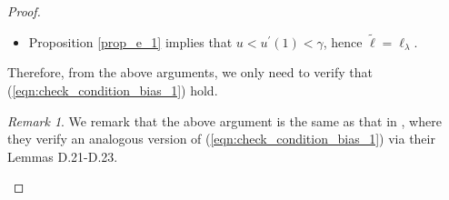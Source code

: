 \documentclass{article}
\theoremstyle{plain}
\theoremstyle{definition}
\theoremstyle{remark}
\newtheorem{remark}[theorem]{Remark}
\newcommand{\bbP}{\mathbb{P}}
\newcommand{\calN}{\mathcal{N}}
\newcommand{\reg}{\varphi_\lambda}
\begin{document}
\begin{appendix}
\begin{proof}
\begin{itemize}
\begin{itemize}
        \item Suppose the following inequalities hold (which we will prove later)
        \begin{equation}\label{eqn:check_condition_bias_1}
      \begin{aligned}
          \frac{ \mathcal{N}_{1}(\lambda) \mathcal{M}_{1, \varphi}^2(\lambda)}{n^2}
    &= 
    o_{d}\left( \mathcal{M}_{2, \varphi}(\lambda) + \frac{\sigma^2}{n} \calN_{2,\varphi}(\lambda)  \right),\\
    \frac{\mathcal{N}_{1}(\lambda)}{n} \ln(n) (\ln\lambda^{-1})^2 \cdot \sum_{i=1}^\infty \frac{\lambda^2 \lambda_i \reg^2(\lambda_i)}{\lambda + \lambda_i} f_i^2  
    &= 
    o_{d}\left( \mathcal{M}_{2, \varphi}(\lambda) + \frac{\sigma^2}{n} \calN_{2,\varphi}(\lambda)  \right).
      \end{aligned}
  \end{equation}
  Then, on one hand, since $u < u^{\prime}(1) < \gamma$, from Lemma 23 in \cite{zhang2024optimal}, there exists $\epsilon>0$, such that
        $$
        n^{\epsilon - 1}\mathcal{N}_{1}(\lambda) = \Theta_d(n^{\epsilon - 1} \lambda^{-1})= o_d(1);
        $$
    On the other hand, following the proof of Lemma D.7 in \cite{lu2024saturation}, with (63) and (64) of \cite{lu2024saturation} being 
    restated as
    (\ref{eqn:check_condition_bias_1}),
 we have 
 \begin{equation*}
        \left\| \tilde{f}_{\lambda} - f_{\lambda}\right\|_{L^{2}}^2 = o_{d, \bbP}\left( \mathcal{M}_{2, \varphi}(\lambda) + \frac{\sigma^2}{n} \calN_{2,\varphi}(\lambda)  \right).
    \end{equation*}
  
    \end{itemize}
        

        

        \item Proposition \ref{prop_e_1} implies that $u < u^{\prime}(1) < \gamma$, hence $\tilde{\ell}=\ell_{\lambda}$.
    \end{itemize}

Therefore, from the above arguments, we only need to verify that (\ref{eqn:check_condition_bias_1}) hold.


\begin{remark}
    We remark that the above argument is the same as that in \cite{lu2024saturation}, where they verify an analogous version of (\ref{eqn:check_condition_bias_1}) 
    via their Lemmas D.21-D.23.
\end{remark}





\end{proof}
\end{appendix}
\end{document}

